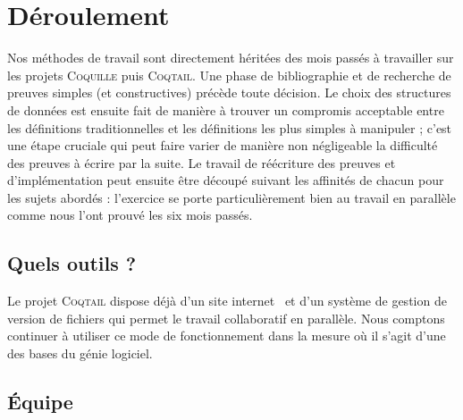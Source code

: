 \documentclass[11pt]{article}
\newcommand{\coqtail}{\textsc{Coqtail}}
\newcommand{\coquille}{\textsc{Coquille}}
\begin{document}
\section{Déroulement}

Nos méthodes de travail sont directement héritées des mois passés à travailler sur les projets \coquille{} puis \coqtail{}. Une phase de bibliographie et de recherche de preuves simples (et constructives) précède toute décision. Le choix des structures de données est ensuite fait de manière à trouver un compromis acceptable entre les définitions traditionnelles et les définitions les plus simples à manipuler ; c'est une étape cruciale qui peut faire varier de manière non négligeable la difficulté des preuves à écrire par la suite. Le travail de réécriture des preuves et d'implémentation peut ensuite être découpé suivant les affinités de chacun pour les sujets abordés : l'exercice se porte particulièrement bien au travail en parallèle comme nous l'ont prouvé les six mois passés.

\subsection{Quels outils ?}

Le projet \coqtail{} dispose déjà d'un site internet~\cite{coqtail} et d'un système de gestion de version de fichiers qui permet le travail collaboratif en parallèle. Nous comptons continuer à utiliser ce mode de fonctionnement dans la mesure où il s'agit d'une des bases du génie logiciel. 





\subsection{Équipe}
\end{document}
